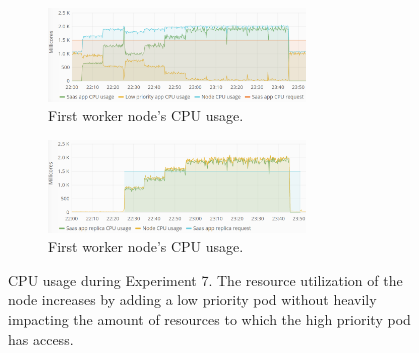 \begin{figure}[H]
\centering
\begin{subfigure}[b]{0.9\textwidth}
\centering
\includegraphics[width=0.75\textwidth]{Images/Experiments/CPU/Grafana/cpu-saas-lpp-hpa-li-1.PNG}
\caption{First worker node's CPU usage.}
\label{fig:cpu-saas-lpp-hpa-li-1}
\end{subfigure}
\hfill
\begin{subfigure}[b]{0.9\textwidth}
\centering
\includegraphics[width=0.75\textwidth]{Images/Experiments/CPU/Grafana/cpu-saas-lpp-hpa-li-2.PNG}
\caption{First worker node's CPU usage.}
\label{fig:cpu-saas-lpp-hpa-li-2}
\end{subfigure}
\hfill
\caption{CPU usage during Experiment 7. The resource utilization of the node increases by adding a low priority pod without heavily impacting the amount of resources to which the high priority pod has access.}
\label{fig:cpu-saas-lpp-hpa-li}
\end{figure}
